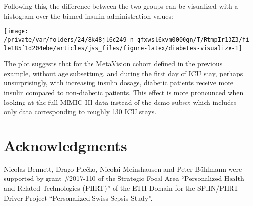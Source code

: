 \documentclass[
  notitle]{jss}
\begin{document}
Following this, the difference between the two groups can be visualized
with a histogram over the binned insulin administration values:

\begin{CodeChunk}


\begin{center}\texttt{[image: /private/var/folders/24/8k48jl6d249\_n\_qfxwsl6xvm0000gn/T/RtmpIr13Z3/file185f1d204ebe/articles/jss\_files/figure-latex/diabetes-visualize-1]} \end{center}

\end{CodeChunk}

The plot suggests that for the MetaVision cohort defined in the previous
example, without age subsettung, and during the first day of ICU stay,
perhaps unsurprisingly, with increasing insulin dosage, diabetic
patients receive more insulin compared to non-diabetic patients. This
effect is more pronounced when looking at the full MIMIC-III data
instead of the demo subset which includes only data corresponding to
roughly 130 ICU stays.

\hypertarget{acknowledgments}{%
\section{Acknowledgments}\label{acknowledgments}}

Nicolas Bennett, Drago Plečko, Nicolai Meinshausen and Peter Bühlmann
were supported by grant \#2017-110 of the Strategic Focal Area
``Personalized Health and Related Technologies (PHRT)'' of the ETH
Domain for the SPHN/PHRT Driver Project ``Personalized Swiss Sepsis
Study''.


\end{document}
